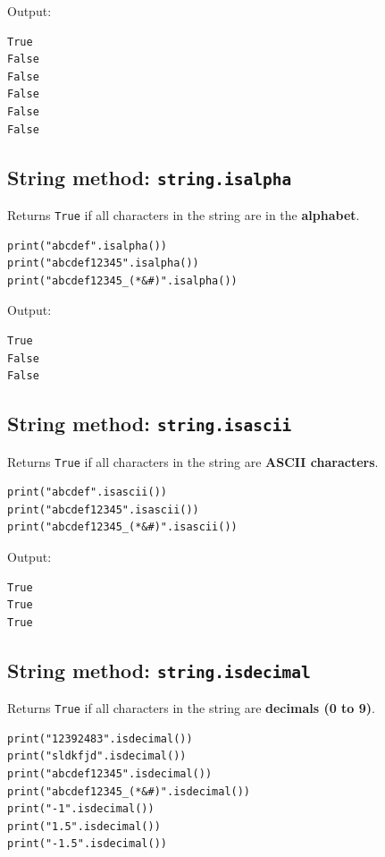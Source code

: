 \documentclass[11pt]{article}
\begin{document}
 \noindent Output:

\begin{verbatim}
True
False
False
False
False
False
\end{verbatim}

\subsection{String method: \texttt{string.isalpha}}
\label{sec:orgeff175b}
Returns \texttt{True} if all characters in the string are in the \textbf{alphabet}.

\begin{verbatim}
print("abcdef".isalpha())
print("abcdef12345".isalpha())
print("abcdef12345_(*&#)".isalpha())
\end{verbatim}

 \noindent Output:

\begin{verbatim}
True
False
False
\end{verbatim}


 \newpage

\subsection{String method: \texttt{string.isascii}}
\label{sec:orgd685376}
Returns \texttt{True} if all characters in the string are \textbf{ASCII characters}.

\begin{verbatim}
print("abcdef".isascii())
print("abcdef12345".isascii())
print("abcdef12345_(*&#)".isascii())
\end{verbatim}

 \noindent Output:

\begin{verbatim}
True
True
True
\end{verbatim}

\subsection{String method: \texttt{string.isdecimal}}
\label{sec:org73739ba}
Returns \texttt{True} if all characters in the string are \textbf{decimals (0 to 9)}.

\begin{verbatim}
print("12392483".isdecimal())
print("sldkfjd".isdecimal())
print("abcdef12345".isdecimal())
print("abcdef12345_(*&#)".isdecimal())
print("-1".isdecimal())
print("1.5".isdecimal())
print("-1.5".isdecimal())
\end{verbatim}
\end{document}
